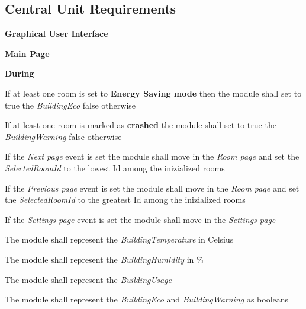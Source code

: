 	\subsection{Central Unit Requirements}
		\begin{req_enum}
			\item \textbf{Graphical User Interface}
			\begin{req_enum}[label*=\arabic*.]
					\item \textbf{Main Page}
						\begin{req_enum}[label*=\arabic*.]
							\item \textbf{During}
								\begin{req_enum}[label*=\arabic*.]			
									\item If at least one room is set to \textbf{Energy Saving mode} then the module shall set to true the \textit{BuildingEco} false otherwise \\
									\item If at least one room is marked as \textbf{crashed} the module shall set to true the \textit{BuildingWarning} false otherwise \\
	
									\item If the \textit{Next page} event is set the module shall move in the \textit{Room page} and set the \textit{SelectedRoomId} to the lowest Id among the inizialized rooms \\
									\item If the \textit{Previous page} event is set the module shall move in the \textit{Room page} and set the \textit{SelectedRoomId} to the greatest Id among the inizialized rooms \\
									\item If the \textit{Settings page} event is set the module shall move in the \textit{Settings page} \\

									\item The module shall represent the \textit{BuildingTemperature} in Celsius\degree \\
									\item The module shall represent the \textit{BuildingHumidity} in \% \\
									\item The module shall represent the \textit{BuildingUsage} \\
									\item The module shall represent the \textit{BuildingEco} and \textit{BuildingWarning} as booleans \\
								\end{req_enum}
						\end{req_enum}


\end{req_enum}
\end{req_enum}
